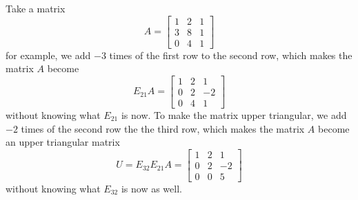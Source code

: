 \documentclass[11pt]{article}
\theoremstyle{break}
\theoremstyle{no_label}
\numberwithin{equation}{theorem}
\begin{document}
Take a matrix $$A=\begin{bmatrix}
    1 & 2 & 1 \\
    3 & 8 & 1 \\
    0 & 4 & 1
\end{bmatrix}$$ for example, we add $-3$ times of the first row to the second row, which makes the matrix $A$ become $$E_{21}A=\begin{bmatrix}
    1 & 2 & 1 \\
    0 & 2 & -2 \\
    0 & 4 & 1
\end{bmatrix}$$ without knowing what $E_{21}$ is now. To make the matrix upper triangular, we add $-2$ times of the second row the the third row, which makes the matrix $A$ become an upper triangular matrix $$U=E_{32}E_{21}A=\begin{bmatrix}
    1 & 2 & 1 \\
    0 & 2 & -2 \\
    0 & 0 & 5
\end{bmatrix}$$
without knowing what $E_{32}$ is now as well.
\end{document}
